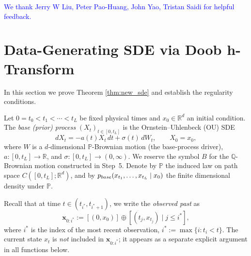 \documentclass{article}
\newcommand{\pbase}{p_{\normalfont{base}}}
\newcommand{\PP}{\mathbb{P}}
\newcommand{\QQ}{\mathbb{Q}}
\newcommand{\RR}{\mathbb{R}}
\begin{document}
\textcolor{blue}{We thank Jerry W Liu, Peter Pao-Huang, John Yao, Tristan Saidi for helpful feedback.}





\printbibliography



\newpage

\appendix

\newpage
\clearpage

\section{Data-Generating SDE via Doob
h-Transform}
\label{appendix:B}
In this section we prove Theorem \ref{thm:new_sde} and establish the regularity conditions.


Let $0 = t_0 < t_1 < \cdots < t_L$ be fixed physical times and $x_0 \in \RR^d$ an
initial condition.  The \emph{base (prior) process} $(X_t)_{t\in[0,t_L]}$ is the
Ornstein--Uhlenbeck (OU) SDE
\begin{equation}\label{eqn:ou}
  dX_t = -a(t)X_t\,dt + \sigma(t)\,dW_t,\qquad X_0=x_0,
\end{equation}
where $W$ is a $d$-dimensional $\PP$-Brownian motion (the base-process driver),
$a:[0,t_L]\to\RR$, and $\sigma:[0,t_L]\to(0,\infty)$.  We reserve the symbol $B$
for the $\QQ$-Brownian motion constructed in Step~5.  Denote by $\PP$ the induced
law on path space $C([0,t_L];\RR^d)$, and by $\pbase(x_{t_1},\ldots,x_{t_L}\mid x_0)$
the finite dimensional density under $\PP$.

Recall that at time $t \in (t_{i^*}, t_{i^*+1})$, we write the \emph{observed past} as
\begin{equation}\label{eqn:xhist}
  \mathbf{x}_{0:i^*} := [(0,x_0)]\oplus[(t_j,x_{t_j})\mid j\leq i^*],
\end{equation}
where $i^*$ is the index of the most recent observation,
$i^* := \max\{i: t_i < t\}$.
The current state $x_t$ is \emph{not} included in $\mathbf{x}_{0:i^*}$; it appears
as a separate explicit argument in all functions below.
\end{document}
